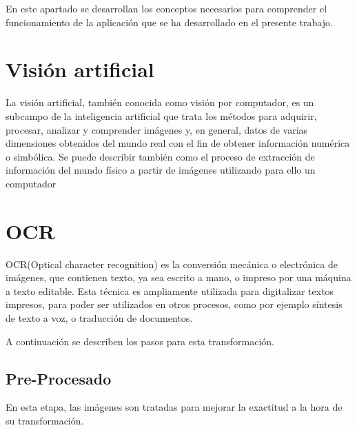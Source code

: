 
En este apartado se desarrollan los conceptos necesarios para comprender el funcionamiento de la aplicación que se ha desarrollado en el presente trabajo.

\section{Visión artificial}

La visión artificial, también conocida como visión por computador, es un subcampo de la inteligencia artificial que trata los métodos para adquirir, procesar, analizar y comprender imágenes y,
en general, datos de varias dimensiones obtenidos del mundo real con el fin de obtener información
numérica o simbólica\cite{wiki:artificial}.
Se puede describir también como el proceso de extracción de información del mundo físico a partir de imágenes utilizando para ello un computador 

\section{OCR} \label{ocr}

OCR(Optical character recognition) es la conversión mecánica o electrónica de imágenes, que contienen texto, ya sea escrito a mano, o impreso por una máquina  a texto editable.
Esta técnica es ampliamente utilizada para digitalizar textos impresos, para poder ser utilizados en otros procesos, como por ejemplo síntesis de texto a voz, o traducción de documentos. \cite{ocr}

A continuación se describen los pasos para esta transformación.

\subsection{Pre-Procesado}
En esta etapa, las imágenes son tratadas para mejorar la exactitud a la hora de su transformación.

